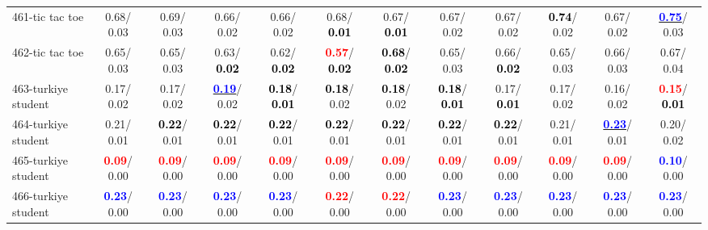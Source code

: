 \begin{table}[h]
\begin{center}
{\begin{tabular}{lc|c|c|c|c|c|c|c|c|c|c}
461-tic tac toe &   0.68/  0.03 &   0.69/  0.03 &   0.66/  0.02 &   0.66/  0.02 &   0.68/\textcolor{black}{\textbf{  0.01}} &   0.67/\textcolor{black}{\textbf{  0.01}} &   0.67/  0.02 &   0.67/  0.02 & \textcolor{black}{\textbf{  0.74}}/  0.02 &   0.67/  0.02 & \underline{\textcolor{blue}{\textbf{  0.75}}}/  0.03 \\
462-tic tac toe &   0.65/  0.03 &   0.65/  0.03 &   0.63/\textcolor{black}{\textbf{  0.02}} &   0.62/\textcolor{black}{\textbf{  0.02}} & \textcolor{red}{\textbf{  0.57}}/\textcolor{black}{\textbf{  0.02}} & \textcolor{black}{\textbf{  0.68}}/\textcolor{black}{\textbf{  0.02}} &   0.65/  0.03 &   0.66/\textcolor{black}{\textbf{  0.02}} &   0.65/  0.03 &   0.66/  0.03 &   0.67/  0.04 \\ \hline
463-turkiye student &   0.17/  0.02 &   0.17/  0.02 & \underline{\textcolor{blue}{\textbf{  0.19}}}/  0.02 & \textcolor{black}{\textbf{  0.18}}/\textcolor{black}{\textbf{  0.01}} & \textcolor{black}{\textbf{  0.18}}/  0.02 & \textcolor{black}{\textbf{  0.18}}/  0.02 & \textcolor{black}{\textbf{  0.18}}/\textcolor{black}{\textbf{  0.01}} &   0.17/\textcolor{black}{\textbf{  0.01}} &   0.17/  0.02 &   0.16/  0.02 & \textcolor{red}{\textbf{  0.15}}/\textcolor{black}{\textbf{  0.01}} \\
464-turkiye student &   0.21/  0.01 & \textcolor{black}{\textbf{  0.22}}/  0.01 & \textcolor{black}{\textbf{  0.22}}/  0.01 & \textcolor{black}{\textbf{  0.22}}/  0.01 & \textcolor{black}{\textbf{  0.22}}/  0.01 & \textcolor{black}{\textbf{  0.22}}/  0.01 & \textcolor{black}{\textbf{  0.22}}/  0.01 & \textcolor{black}{\textbf{  0.22}}/  0.01 &   0.21/  0.01 & \underline{\textcolor{blue}{\textbf{  0.23}}}/  0.01 &   0.20/  0.02 \\
465-turkiye student & \textcolor{red}{\textbf{  0.09}}/  0.00 & \textcolor{red}{\textbf{  0.09}}/  0.00 & \textcolor{red}{\textbf{  0.09}}/  0.00 & \textcolor{red}{\textbf{  0.09}}/  0.00 & \textcolor{red}{\textbf{  0.09}}/  0.00 & \textcolor{red}{\textbf{  0.09}}/  0.00 & \textcolor{red}{\textbf{  0.09}}/  0.00 & \textcolor{red}{\textbf{  0.09}}/  0.00 & \textcolor{red}{\textbf{  0.09}}/  0.00 & \textcolor{red}{\textbf{  0.09}}/  0.00 & \textcolor{blue}{\textbf{  0.10}}/  0.00 \\
466-turkiye student & \textcolor{blue}{\textbf{  0.23}}/  0.00 & \textcolor{blue}{\textbf{  0.23}}/  0.00 & \textcolor{blue}{\textbf{  0.23}}/  0.00 & \textcolor{blue}{\textbf{  0.23}}/  0.00 & \textcolor{red}{\textbf{  0.22}}/  0.00 & \textcolor{red}{\textbf{  0.22}}/  0.00 & \textcolor{blue}{\textbf{  0.23}}/  0.00 & \textcolor{blue}{\textbf{  0.23}}/  0.00 & \textcolor{blue}{\textbf{  0.23}}/  0.00 & \textcolor{blue}{\textbf{  0.23}}/  0.00 & \textcolor{blue}{\textbf{  0.23}}/  0.00 \\

\end{tabular}}
\end{center}
\end{table}
